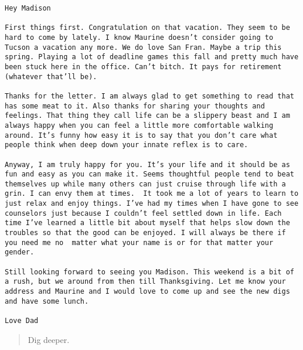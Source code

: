 \begin{verbatim}
Hey Madison

First things first. Congratulation on that vacation. They seem to be hard to come by lately. I know Maurine doesn’t consider going to Tucson a vacation any more. We do love San Fran. Maybe a trip this spring. Playing a lot of deadline games this fall and pretty much have been stuck here in the office. Can’t bitch. It pays for retirement (whatever that’ll be).

Thanks for the letter. I am always glad to get something to read that has some meat to it. Also thanks for sharing your thoughts and feelings. That thing they call life can be a slippery beast and I am always happy when you can feel a little more comfortable walking around. It’s funny how easy it is to say that you don’t care what people think when deep down your innate reflex is to care.

Anyway, I am truly happy for you. It’s your life and it should be as fun and easy as you can make it. Seems thoughtful people tend to beat themselves up while many others can just cruise through life with a grin. I can envy them at times.  It took me a lot of years to learn to just relax and enjoy things. I’ve had my times when I have gone to see counselors just because I couldn’t feel settled down in life. Each time I’ve learned a little bit about myself that helps slow down the troubles so that the good can be enjoyed. I will always be there if you need me no  matter what your name is or for that matter your gender.

Still looking forward to seeing you Madison. This weekend is a bit of a rush, but we around from then till Thanksgiving. Let me know your address and Maurine and I would love to come up and see the new digs and have some lunch.

Love Dad
\end{verbatim}

\begin{quote}
Dig deeper.
\end{quote}
